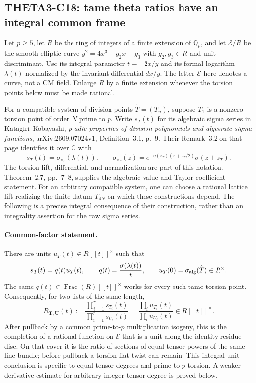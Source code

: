 \documentclass[11pt]{article}
\newcommand{\Q}{\mathbb Q}\newcommand{\C}{\mathbb C}\newcommand{\Z}{\mathbb Z}\newcommand{\R}{\mathbb R}\newcommand{\A}{\mathbb A}\newcommand{\OO}{\mathcal O}
\theoremstyle{definition}\newtheorem{definition}[theorem]{Definition}\newtheorem{remark}[theorem]{Remark}
\begin{document}
\subsection{THETA3-C18: tame theta ratios have an integral common frame}\label{C18}

Let $p\geq5$, let $R$ be the ring of integers of a finite extension of
$\Q_p$, and let $\mathcal E/R$ be the smooth elliptic curve
$y^2=4x^3-g_2x-g_3$ with $g_2,g_3\in R$ and unit discriminant.
Use its integral parameter $t=-2x/y$ and its formal logarithm
$\lambda(t)$ normalized by the invariant differential $dx/y$.
The letter $\mathcal E$ here denotes a curve, not a CM field.
Enlarge $R$ by a finite extension whenever the torsion points below
must be made rational.

For a compatible system of division points $\widetilde T=(T_n)$,
suppose $T_1$ is a nonzero torsion point of order $N$ prime to $p$.
Write $s_T(t)$ for its algebraic sigma series in
Katagiri--Kobayashi, \emph{p-adic properties of division polynomials
and algebraic sigma functions}, arXiv:2609.07024v1,
Definition~3.1, p.~9. Their Remark~3.2 on that page identifies it over
$\C$ with
\[
 s_T(t)=\sigma_{z_T}(\lambda(t)),\qquad
 \sigma_{z_T}(z)=
 e^{-\eta(z_T)(z+z_T/2)}\sigma(z+z_T).
\]
The torsion lift, differential, and normalization are part of this
notation. Theorem~2.7, pp.~7--8, supplies the algebraic value and
Taylor-coefficient statement. For an arbitrary compatible system,
one can choose a rational lattice lift realizing the finite datum
$T_{4N}$ on which these constructions depend.
The following is a precise integral consequence of their
construction, rather than an integrality assertion for the raw sigma
series.

\paragraph{Common-factor statement.}
There are units $u_T(t)\in R[[t]]^\times$ such that
\begin{equation}\label{C18-factor}
 s_T(t)=q(t)u_T(t),\qquad
 q(t)=\frac{\sigma(\lambda(t))}{t},\qquad
 u_T(0)=\sigma_{\rm alg}(\widetilde T)\in R^\times.
\end{equation}
The same $q(t)\in\operatorname{Frac}(R)[[t]]^\times$ works for every
such tame torsion point. Consequently, for two lists of the same
length,
\begin{equation}\label{C18-ratio}
 R_{\mathbf T,\mathbf U}(t):=
 \frac{\prod_{i=1}^r s_{T_i}(t)}
      {\prod_{i=1}^r s_{U_i}(t)}
       =\frac{\prod_i u_{T_i}(t)}{\prod_i u_{U_i}(t)}
       \in R[[t]]^\times.
\end{equation}
After pullback by a common prime-to-$p$ multiplication isogeny,
this is the completion of a rational function on
$\mathcal E$ that is a unit along the identity residue disc.
On that cover it is the ratio of sections of equal tensor powers
of the same line bundle; before pullback a torsion flat twist can
remain. This integral-unit conclusion is specific to equal tensor
degrees and prime-to-$p$ torsion. A weaker derivative estimate for
arbitrary integer tensor degree is proved below.
\end{document}
